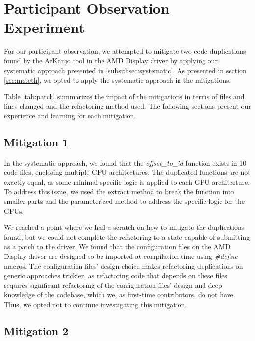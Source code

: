 \en

\section{Participant Observation Experiment}

For our participant observation, we attempted to mitigate two code 
duplications found by the ArKanjo tool in the AMD Display driver by applying 
our systematic approach presented in \ref{subsubsec:systematic}. 
As presented in section \ref{sec:meteth},
we opted to apply the systematic approach in the mitigations.

Table \ref{tab:patch} summarizes the impact of the mitigations in terms of 
files and lines changed and the refactoring method used. The following sections
present our experience and learning for each mitigation.



\subsection{Mitigation 1}

In the systematic approach, we found that the \textit{offset\_to\_id} function
exists in 10 code files, enclosing multiple GPU architectures. The duplicated
functions are not exactly equal, as some minimal specific logic is applied to 
each GPU architecture. To address this issue, we used the extract method to
break the function into smaller parts and the parameterized method to address
the specific logic for the GPUs.

We reached a point where we had a scratch on how to mitigate the duplications found, 
but we could not complete the refactoring to a state capable of submitting as a 
patch to the driver. We found that the configuration files on the AMD Display 
driver are designed to be imported at compilation time using \textit{\#define} macros. 
The configuration files' design choice makes refactoring duplications on generic 
approaches trickier, as refactoring code that depends on these files requires 
significant refactoring of the configuration files' design and deep knowledge 
of the codebase, which we, as first-time contributors, do not have. Thus, we opted 
not to continue investigating this mitigation.


\subsection{Mitigation 2}

